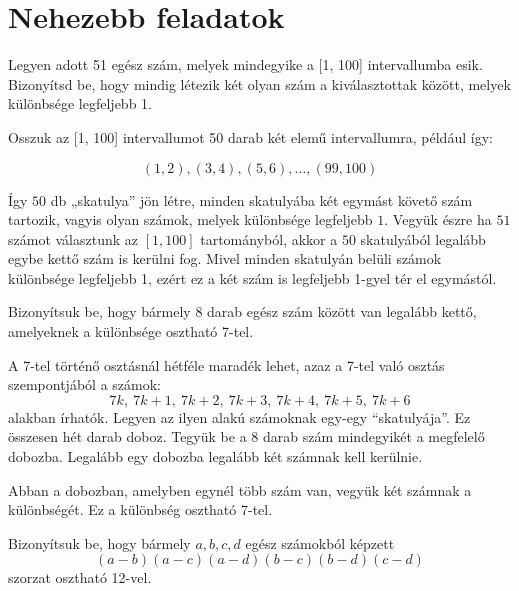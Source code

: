 \section*{Nehezebb feladatok}
\begin{extraproblem}
	Legyen adott 51 egész szám, melyek mindegyike a {[}1, 100{]} intervallumba
	esik. Bizonyítsd be, hogy mindig létezik két olyan szám a kiválasztottak
	között, melyek különbsége legfeljebb 1. 
\end{extraproblem}

\begin{solution}
	Osszuk az {[}1, 100{]} intervallumot 50 darab két elemű intervallumra,
	például így:
	
	\[
	(1,2),(3,4),(5,6),\ldots,(99,100)
	\]
	
	Így $50$ db „skatulya” jön létre, minden skatulyába két egymást követő
	szám tartozik, vagyis olyan számok, melyek különbsége legfeljebb $1$.
	Vegyük észre ha $51$ számot választunk az $[1,100]$ tartományból,
	akkor a $50$ skatulyából legalább egybe kettő szám is kerülni fog.
	Mivel minden skatulyán belüli számok különbsége legfeljebb 1, ezért
	ez a két szám is legfeljebb 1-gyel tér el egymástól. 
\end{solution}
\begin{extraproblem}
	Bizonyítsuk be, hogy bármely 8 darab egész szám között van legalább
	kettő, amelyeknek a különbsége osztható 7-tel.
\end{extraproblem}

\begin{solution}
	A 7-tel történő osztásnál hétféle maradék lehet, azaz a 7-tel való
	osztás szempontjából a számok: 
	\[
	7k,\ 7k+1,\ 7k+2,\ 7k+3,\ 7k+4,\ 7k+5,\ 7k+6
	\]
	alakban írhatók. Legyen az ilyen alakú számoknak egy-egy ``skatulyája''.
	Ez összesen hét darab doboz. Tegyük be a 8 darab szám mindegyikét
	a megfelelő dobozba. Legalább egy dobozba legalább két számnak kell
	kerülnie.
	
	Abban a dobozban, amelyben egynél több szám van, vegyük két számnak
	a különbségét. Ez a különbség osztható 7-tel.
\end{solution}
\begin{extraproblem}
	Bizonyítsuk be, hogy bármely $a,b,c,d$ egész számokból képzett 
	\[
	(a-b)(a-c)(a-d)(b-c)(b-d)(c-d)
	\]
	szorzat osztható 12-vel.
\end{extraproblem}

